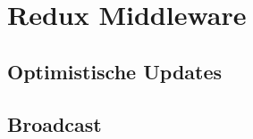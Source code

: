 \section{Redux Middleware}
\label{sec:f-redux-middleware}

\subsection{Optimistische Updates}
\label{ssec:fm-optimistische_updates}

\subsection{Broadcast}
\label{ssec:fm-broadcast}
